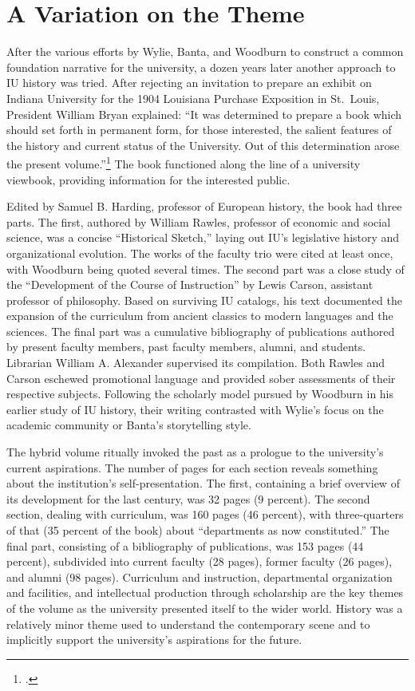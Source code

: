 \documentclass[
  american,
  letterpaper,
]{scrreprt}
\begin{document}
\section{A Variation on the Theme}\label{a-variation-on-the-theme}

After the various efforts by Wylie, Banta, and Woodburn to construct a
common foundation narrative for the university, a dozen years later
another approach to IU history was tried. After rejecting an invitation
to prepare an exhibit on Indiana University for the 1904 Louisiana
Purchase Exposition in St.~Louis, President William Bryan explained:
``It was determined to prepare a book which should set forth in
permanent form, for those interested, the salient features of the
history and current status of the University. Out of this determination
arose the present volume.''\footnote{.} The book functioned
along the line of a university viewbook, providing information for the
interested public.

Edited by Samuel B. Harding, professor of European history, the book had
three parts. The first, authored by William Rawles, professor of
economic and social science, was a concise ``Historical Sketch,'' laying
out IU's legislative history and organizational evolution. The works of
the faculty trio were cited at least once, with Woodburn being quoted
several times. The second part was a close study of the ``Development of
the Course of Instruction'' by Lewis Carson, assistant professor of
philosophy. Based on surviving IU catalogs, his text documented the
expansion of the curriculum from ancient classics to modern languages
and the sciences. The final part was a cumulative bibliography of
publications authored by present faculty members, past faculty members,
alumni, and students. Librarian William A. Alexander supervised its
compilation. Both Rawles and Carson eschewed promotional language and
provided sober assessments of their respective subjects. Following the
scholarly model pursued by Woodburn in his earlier study of IU history,
their writing contrasted with Wylie's focus on the academic community or
Banta's storytelling style.

The hybrid volume ritually invoked the past as a prologue to the
university's current aspirations. The number of pages for each section
reveals something about the institution's self-presentation. The first,
containing a brief overview of its development for the last century, was
32 pages (9 percent). The second section, dealing with curriculum, was
160 pages (46 percent), with three-quarters of that (35 percent of the
book) about ``departments as now constituted.'' The final part,
consisting of a bibliography of publications, was 153 pages (44
percent), subdivided into current faculty (28 pages), former faculty (26
pages), and alumni (98 pages). Curriculum and instruction, departmental
organization and facilities, and intellectual production through
scholarship are the key themes of the volume as the university presented
itself to the wider world. History was a relatively minor theme used to
understand the contemporary scene and to implicitly support the
university's aspirations for the future.
\end{document}

